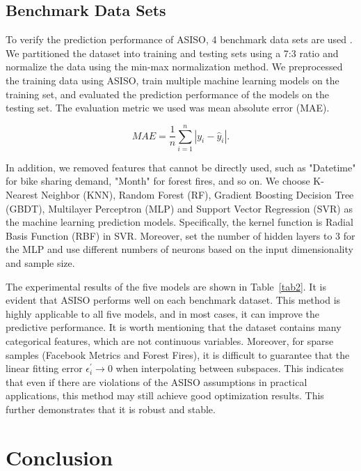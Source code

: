 \documentclass[sn-mathphys,Numbered]{sn-jnl}%
\theoremstyle{thmstyleone}%
\theoremstyle{thmstyletwo}%
\theoremstyle{thmstylethree}%
\begin{document}
\subsection{Benchmark Data Sets}\label{subsec2}

To verify the prediction performance of ASISO, 4 benchmark data sets are used \cite{bib28,bib29}. We partitioned the dataset into training and testing sets using a 7:3 ratio and normalize the data using the min-max normalization method. We preprocessed the training data using ASISO, train multiple machine learning models on the training set, and evaluated the prediction performance of the models on the testing set. The evaluation metric we used was mean absolute error (MAE). 

\begin{equation}
MAE=\dfrac{1}{n}\sum\limits_{i=1}^n|y_i-\hat{y}_i|.\label{eq15}
\end{equation}

In addition, we removed features that cannot be directly used, such as "Datetime" for bike sharing demand, "Month" for forest fires, and so on. We choose K-Nearest Neighbor (KNN), Random Forest (RF), Gradient Boosting Decision Tree (GBDT), Multilayer Perceptron (MLP) and Support Vector Regression (SVR) as the machine learning prediction models. Specifically, the kernel function is Radial Basis Function (RBF) in SVR. Moreover, set the number of hidden layers to 3 for the MLP and use different numbers of neurons based on the input dimensionality and sample size. 

The experimental results of the five models are shown in Table~\ref{tab2}. It is evident that ASISO performs well on each benchmark dataset. This method is highly applicable to all five models, and in most cases, it can improve the predictive performance. It is worth mentioning that the dataset contains many categorical features, which are not continuous variables. Moreover, for sparse samples (Facebook Metrics and Forest Fires), it is difficult to guarantee that the linear fitting error $\epsilon^\prime_i\rightarrow0$ when interpolating between subspaces. This indicates that even if there are violations of the ASISO assumptions in practical applications, this method may still achieve good optimization results. This further demonstrates that it is robust and stable.


\section{Conclusion}\label{sec5}
\end{document}
